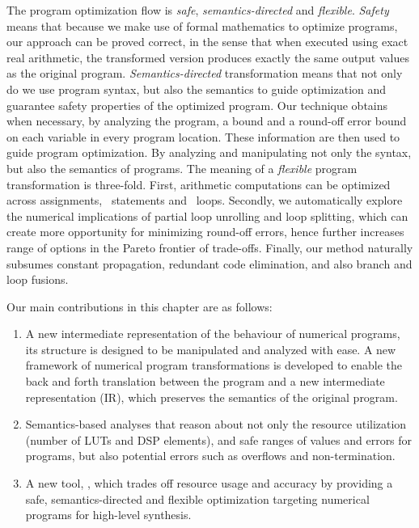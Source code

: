The program optimization flow is \emph{safe}, \emph{semantics-directed} and
\emph{flexible}. \emph{Safety} means that because we make use of formal
mathematics to optimize programs, our approach can be proved correct, in
the sense that when executed using exact real arithmetic, the transformed
version produces exactly the same output values as the original program.
\emph{Semantics-directed} transformation means that not only do we use
program syntax, but also the semantics to guide optimization and guarantee
safety properties of the optimized program.  Our technique obtains when
necessary, by analyzing the program, a bound and a round-off error bound on
each variable in every program location.  These information are then used
to guide program optimization.  By analyzing and manipulating not only the
syntax, but also the semantics of programs.  The meaning of a \emph{flexible}
program transformation is three-fold.  First, arithmetic computations can be
optimized across assignments, \iflit~statements and \whilelit~loops.  Secondly,
we automatically explore the numerical implications of partial loop unrolling
and loop splitting, which can create more opportunity for minimizing round-off
errors, hence further increases range of options in the Pareto frontier of
trade-offs.  Finally, our method naturally subsumes constant propagation,
redundant code elimination, and also branch and loop fusions.


Our main contributions in this chapter are as follows:
\begin{enumerate}
    \vspace{-6pt}
    \item
        A new intermediate representation of the behaviour of numerical
        programs, its structure is designed to be manipulated and analyzed
        with ease.  A new framework of numerical program transformations is
        developed to enable the back and forth translation between the program
        and a new intermediate representation (IR), which preserves the
        semantics of the original program.
    \vspace{-6pt}
    \item
        Semantics-based analyses that reason about not only the resource
        utilization (number of LUTs and DSP elements), and safe ranges of
        values and errors for programs, but also potential errors such as
        overflows and non-termination.
    \vspace{-6pt}
    \item
        A new tool, \newsoap, which trades off resource usage and accuracy
        by providing a safe, semantics-directed and flexible optimization
        targeting numerical programs for high-level synthesis.
    \vspace{-6pt}
\end{enumerate}

